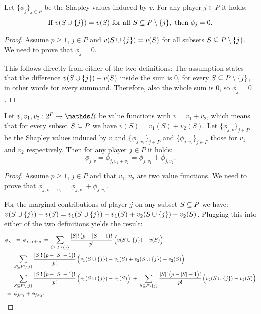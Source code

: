 {\begin{enumerate}
    \begin{theorem}
    Let $\{\phi_j\}_{j \in P}$ be the Shapley values induced by $v$.
    For any player $j \in P$  it holds:
    $$
    \text{If } v(S \cup \{j\}) = v(S) \text{ for all } S \subseteq P \setminus \{j\}, \text{ then } \phi_j = 0.
    $$
    \end{theorem}

    \begin{proof}

        Assume $p \geq 1$, $ j \in P$ and $v(S \cup \{j\}) = v(S)$ for all subsets $S \subseteq P \setminus \{j\}$. We need to prove that $\phi_j = 0$.
        
        This follows directly from either of the two definitions: The assumption states that the difference $v(S \cup \{j\}) - v(S)$ inside the sum is 0, for every $S \subseteq P \setminus \{j\}$, in other words for every summand.
        Therefore, also the whole sum is 0, so $\phi_j = 0$.
        
    \end{proof}

    \begin{theorem}[Additivity]
    Let $v, v_1, v_2 : 2^P \to \R$ be value functions with $v = v_1 + v_2$, which means that for every subset $S \subseteq P$ we have $v(S) = v_1(S) + v_2(S)$.
    Let $\{\phi_{j, v}\}_{j \in P}$ be the Shapley values induced by $v$ and $\{\phi_{j, v_1}\}_{j \in P}$ and $\{\phi_{j, v_2}\}_{j \in P}$ those for $v_1$ and $v_2$ respectively.
    Then for any player $j \in P$ it holds:
    $$
    \phi_{j, v} = \phi_{j, v_1+v_2} = \phi_{j, v_1} + \phi_{j, v_2}.
    $$
    \end{theorem}

    \begin{proof}

        Assume $p \geq 1$, $ j \in P$ and that $v_1, v_2$ are two value functions. We need to prove that $\phi_{j, v_1+v_2} = \phi_{j, v_1} + \phi_{j, v_2}$.
        
        For the marginal contributions of player $j$ on any subset $S \subseteq P$ we have: $v(S \cup \{j\}) - v(S) = v_1(S \cup \{j\}) - v_1(S) + v_2(S \cup \{j\}) - v_2(S)$.
        Plugging this into either of the two definitions yields the result:
        \begin{align*}
            &\phi_{j, v} \,=\, \phi_{j, v_1+v_2}
            \,=\, \sum_{S \subseteq P \setminus \{j\}} \frac{|S|!\,\bigl(p - |S| - 1\bigr)!}{p!} \, \Bigl( v(S \cup \{j\}) - v(S) \Bigr)  \\
            &\,=\, \sum_{S \subseteq P \setminus \{j\}} \frac{|S|!\,\bigl(p - |S| - 1\bigr)!}{p!} \, \Bigl( v_1(S \cup \{j\}) - v_1(S) + v_2(S \cup \{j\}) - v_2(S) \Bigr) \\
            &\,=\, \sum_{S \subseteq P \setminus \{j\}} \frac{|S|!\,\bigl(p - |S| - 1\bigr)!}{p!} \, \Bigl( v_1(S \cup \{j\}) - v_1(S) \Bigr)
            \,+\, \sum_{S \subseteq P \setminus \{j\}} \frac{|S|!\,\bigl(p - |S| - 1\bigr)!}{p!} \, \Bigl( v_2(S \cup \{j\}) - v_2(S) \Bigr) \\
            &\,=\, \phi_{j, v_1} + \phi_{j, v_2}.
        \end{align*}
        

\end{proof}
\end{enumerate}}
